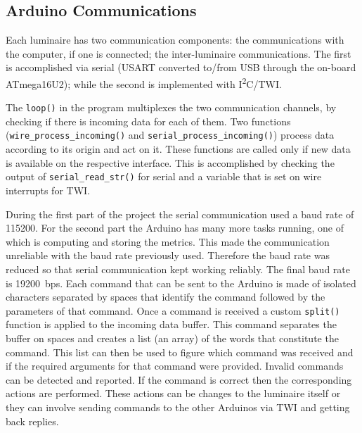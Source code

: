 \subsection{Arduino Communications}
\label{sec:ArduinoCommunications}

Each luminaire has two communication components: the communications with the computer, if one is connected; the inter-luminaire communications. The first is accomplished via serial (USART converted to/from USB through the on-board ATmega16U2); while the second is implemented with I\textsuperscript{2}C/TWI.

The \texttt{loop()} in the program multiplexes the two communication channels, by checking if there is incoming data for each of them. Two functions (\texttt{wire\_process\_incoming()} and \texttt{serial\_process\_incoming()}) process data according to its origin and act on it. These functions are called only if new data is available on the respective interface. This is accomplished by checking the output of \texttt{serial\_read\_str()} for serial and a variable that is set on wire interrupts for TWI.

During the first part of the project the serial communication used a baud rate of 115200. For the second part the Arduino has many more tasks running, one of which is computing and storing the metrics. This made the communication unreliable with the baud rate previously used. Therefore the baud rate was reduced so that serial communication kept working reliably. The final baud rate is \SI{19200}{bps}. Each command that can be sent to the Arduino is made of isolated characters separated by spaces that identify the command followed by the parameters of that command. Once a command is received a custom \texttt{split()} function is applied to the incoming data buffer. This command separates the buffer on spaces and creates a list (an array) of the words that constitute the command. This list can then be used to figure which command was received and if the required arguments for that command were provided. Invalid commands can be detected and reported. If the command is correct then the corresponding actions are performed. These actions can be changes to the luminaire itself or they can involve sending commands to the other Arduinos via TWI and getting back replies.

